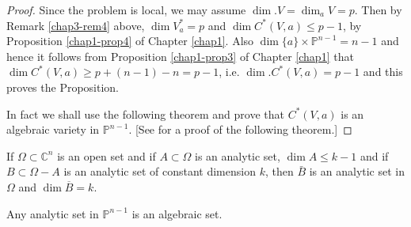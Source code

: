 \begin{proof} %
  Since the problem is local, we may assume $ \dim.  V = \dim_{a}
  V=p$. Then by Remark \ref{chap3-rem4} above, $\dim V^{\ast}_{a} = p$ and $\dim
  C^{\ast}(V,a) \leq p-1$, by Proposition \ref{chap1-prop4} of Chapter
  \ref{chap1}. Also 
  $\dim \{a\} \times \mathbb{P}^{n-1} = n-1$ and hence it follows
  from Proposition \ref{chap1-prop3} of Chapter \ref{chap1} that $\dim
  C^{\ast}(V,a) \geq p + (n-1) -n = p-1$, i.e. $\dim. C^{\ast}(V,a) = p-1$ and
  this proves the Proposition. 


In fact we shall use the following theorem and prove that $C^{\ast}(V,a)$ is an algebraic variety in $\mathbb{P}^{n-1}$. [See \cite{key2}
  for a proof of the following theorem.] 
\end{proof}

\begin{theorem*} %
  If $\Omega \subset  \mathbb{C}^n$ is an open set and if $A \subset
  \Omega$ is an analytic set, $\dim A \leq k-1$ and if  $B \subset
  \Omega-A$ is an analytic set of constant dimension $k$, then 
  $\bar{B}$ is an analytic set in $\Omega$ and $\dim
  \overline{B}= k$. 
\end{theorem*}

\begin{theorem*}[(Chow).] %
Any analytic set in $\mathbb{P}^{n-1}$ is an algebraic set.
\end{theorem*}

